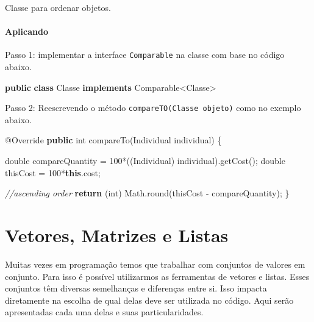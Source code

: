 \documentclass[
]{book}
\newenvironment{Shaded}{\begin{snugshade}}{\end{snugshade}}
\newcommand{\AttributeTok}[1]{\textcolor[rgb]{0.77,0.63,0.00}{#1}}
\newcommand{\BuiltInTok}[1]{#1}
\newcommand{\CommentTok}[1]{\textcolor[rgb]{0.56,0.35,0.01}{\textit{#1}}}
\newcommand{\DataTypeTok}[1]{\textcolor[rgb]{0.13,0.29,0.53}{#1}}
\newcommand{\DecValTok}[1]{\textcolor[rgb]{0.00,0.00,0.81}{#1}}
\newcommand{\FunctionTok}[1]{\textcolor[rgb]{0.00,0.00,0.00}{#1}}
\newcommand{\KeywordTok}[1]{\textcolor[rgb]{0.13,0.29,0.53}{\textbf{#1}}}
\newcommand{\NormalTok}[1]{#1}
\begin{document}
Classe para ordenar objetos.

\hypertarget{aplicando}{%
\subsubsection{Aplicando}\label{aplicando}}

Passo 1: implementar a interface \texttt{Comparable} na classe com base no código abaixo.

\begin{Shaded}
\begin{Highlighting}[]
\KeywordTok{public} \KeywordTok{class}\NormalTok{ Classe }\KeywordTok{implements} \BuiltInTok{Comparable}\NormalTok{<Classe>}
\end{Highlighting}
\end{Shaded}

Passo 2: Reescrevendo o método \texttt{compareTO(Classe\ objeto)} como no exemplo abaixo.

\begin{Shaded}
\begin{Highlighting}[]
\AttributeTok{@Override}
\KeywordTok{public} \DataTypeTok{int} \FunctionTok{compareTo}\NormalTok{(Individual individual) \{}

    \DataTypeTok{double}\NormalTok{ compareQuantity = }\DecValTok{100}\NormalTok{*((Individual) individual).}\FunctionTok{getCost}\NormalTok{();}
    \DataTypeTok{double}\NormalTok{ thisCost = }\DecValTok{100}\NormalTok{*}\KeywordTok{this}\NormalTok{.}\FunctionTok{cost}\NormalTok{;}

    \CommentTok{//ascending order}
    \KeywordTok{return}\NormalTok{ (}\DataTypeTok{int}\NormalTok{) }\BuiltInTok{Math}\NormalTok{.}\FunctionTok{round}\NormalTok{(thisCost - compareQuantity);}
\NormalTok{\}}
\end{Highlighting}
\end{Shaded}

\hypertarget{vetores-matrizes-e-listas}{%
\chapter{Vetores, Matrizes e Listas}\label{vetores-matrizes-e-listas}}

Muitas vezes em programação temos que trabalhar com conjuntos de valores em conjunto. Para isso é possível utilizarmos as ferramentas de vetores e listas. Esses conjuntos têm diversas semelhanças e diferenças entre si. Isso impacta diretamente na escolha de qual delas deve ser utilizada no código. Aqui serão apresentadas cada uma delas e suas particularidades.
\end{document}
